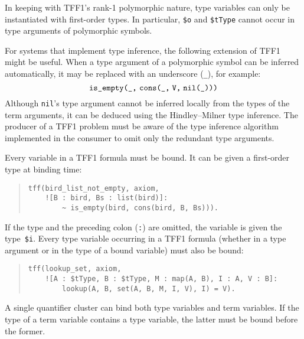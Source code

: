 In keeping with TFF1's rank-1 polymorphic nature, type variables can only be
instantiated with first-order types. In particular, \verb+$o+ and \verb+$tType+
cannot occur in type arguments of polymorphic symbols.

For systems that implement type inference, the following extension
of TFF1 might be useful. When a type argument of
a polymorphic symbol can be inferred automatically, it may be
replaced with an underscore ({\tt \_}), for example:
\[\hbox{{\tt is\_empty(\_,} {\tt cons(\_,\;V,\;nil(\_)))}}\]
Although {\tt nil}'s type argument cannot be inferred locally from the types of
the term arguments, it can be deduced using the Hindley--Milner type inference.
The producer of a TFF1 problem must be aware of the type inference algorithm
implemented in the consumer to omit only the redundant type arguments.

Every variable in a TFF1 formula must be bound. It can be given a first-order
type at binding time:
\begin{quote}
\begin{verbatim}
tff(bird_list_not_empty, axiom,
    ![B : bird, Bs : list(bird)]:
        ~ is_empty(bird, cons(bird, B, Bs))).
\end{verbatim}
\end{quote}
If the type and the preceding colon ({\tt :}) are omitted, the variable is given
the type~\verb+$i+. Every type variable occurring in a TFF1 formula
(whether in a type argument or in the type of a bound variable)
must also be bound:
\begin{quote}
\begin{verbatim}
tff(lookup_set, axiom,
    ![A : $tType, B : $tType, M : map(A, B), I : A, V : B]:
        lookup(A, B, set(A, B, M, I, V), I) = V).
\end{verbatim}
\end{quote}
A single quantifier cluster can bind both type variables and term variables. If
the type of a term variable contains a type variable, the latter must be bound
before the former.


